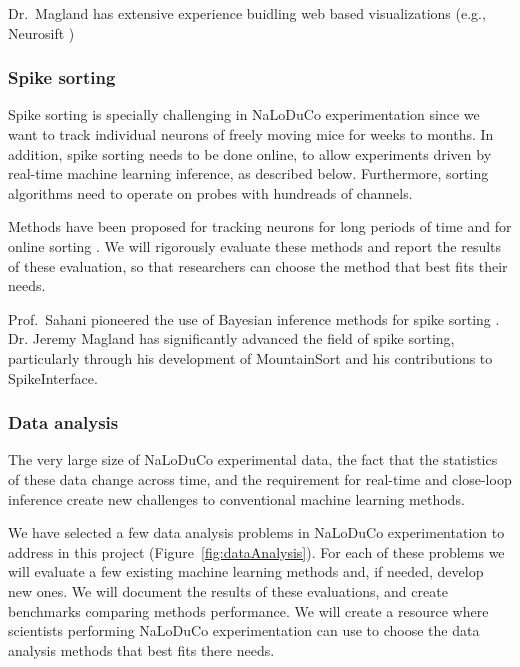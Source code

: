Dr.~Magland has extensive experience buidling web based visualizations (e.g.,
Neurosift \citep{neurosift})

\subsubsection{Spike sorting}

Spike sorting is specially challenging in NaLoDuCo experimentation since we
want to track individual neurons of freely moving mice for weeks to months.
%
In addition, spike sorting needs to be done online, to allow experiments driven
by real-time machine learning inference, as described below.
%
Furthermore, sorting algorithms need to operate on probes with hundreads of
channels.

Methods have been proposed for tracking neurons for long periods of time
\citep[e.g.,][]{yuanEtAl24,vanBeestEtAl24} and for online sorting
\citep[e.g.,][]{rutishauserEtAl06,santhanamEtAl04}. We will rigorously evaluate these
methods and report the results of these evaluation, so that researchers can
choose the method that best fits their needs.

Prof.~Sahani pioneered the use of Bayesian inference methods for spike sorting
\citep{sahani99}. Dr. Jeremy Magland has significantly advanced the field of
spike sorting, particularly through his development of MountainSort
\citep{mountainSort5} and his contributions to
SpikeInterface\citep{spikeInterface}.

\subsubsection{Data analysis}

The very large size of NaLoDuCo experimental data, the fact that the statistics
of these data change across time, and the requirement for real-time and
close-loop inference create new challenges to conventional machine learning
methods.

We have selected a few data analysis problems in NaLoDuCo experimentation to
address in this project (Figure~\ref{fig:dataAnalysis}).
%
For each of these problems we will evaluate a few existing machine learning
methods and, if needed, develop new ones.
%
We will document the results of these evaluations, and create benchmarks
comparing methods performance.
%
We will create a resource where scientists performing NaLoDuCo experimentation
can use to choose the data analysis methods that best fits there needs.

